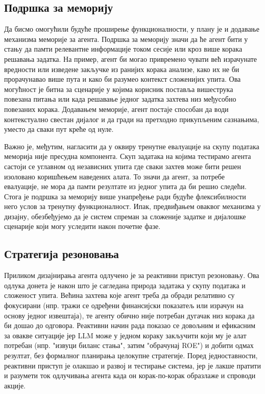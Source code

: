 \subsection{Подршка за меморију}

Да бисмо омогућили будуће проширење функционалности, у плану је и додавање механизма меморије за агента. Подршка за меморију значи да ће агент бити у стању да памти релевантне информације током сесије или кроз више корака решавања задатка. На пример, агент би могао привремено чувати већ израчунате вредности или изведене закључке из ранијих корака анализе, како их не би прорачунавао више пута и како би разумео контекст сложенијих упита. Ова могућност је битна за сценарије у којима корисник поставља вишеструка повезана питања или када решавање једног задатка захтева низ међусобно повезаних корака. Додавањем меморије, агент постаје способан да води контекстуално свестан дијалог и да гради на претходно прикупљеним сазнањима, уместо да сваки пут креће од нуле.

Важно је, међутим, нагласити да у оквиру тренутне евалуације на скупу података меморија није пресудна компонента. Скуп задатака на којима тестирамо агента састоји се углавном од независних упита где сваки захтев може бити решен изоловано коришћењем наведених алата. То значи да агент, за потребе евалуације, не мора да памти резултате из једног упита да би решио следећи. Стога је подршка за меморију више унапређење ради будуће флексибилности него услов за тренутну функционалност. Ипак, предвиђањем оваквог механизма у дизајну, обезбеђујемо да је систем спреман за сложеније задатке и дијалошке сценарије који могу уследити након почетне фазе.

\subsection{Стратегија резоновања}

Приликом дизајнирања агента одлучено је за реактивни приступ резоновању. Ова одлука донета је након што је сагледана природа задатака у скупу података и сложеност упита. Већина захтева које агент треба да обради релативно су фокусирани (нпр. тражи се одређени финансијски показатељ или израчун на основу једног извештаја), те агенту обично није потребан дугачак низ корака да би дошао до одговора. Реактивни начин рада показао се довољним и ефикасним за овакве ситуације јер LLM може у једном кораку закључити који му је алат потребан (нпр. "извуци биланс стања", затим "обрачунај ROE") и добити одмах резултат, без формалног планирања целокупне стратегије. Поред једноставности, реактивни приступ је олакшао и развој и тестирање система, јер је лакше пратити и разумети ток одлучивања агента када он корак-по-корак образлаже и спроводи акције.


